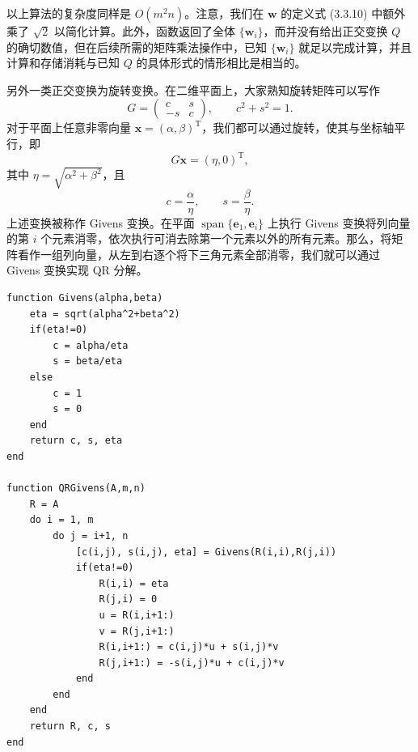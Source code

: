 以上算法的复杂度同样是 $O(m^2n)$。注意，我们在 $\bm w$ 的定义式 (3.3.10) 中额外乘了 $\sqrt2$ 以简化计算。此外，函数返回了全体 $\{\bm w_i\}$，而并没有给出正交变换 $Q$ 的确切数值，但在后续所需的矩阵乘法操作中，已知 $\{\bm w_i\}$ 就足以完成计算，并且计算和存储消耗与已知 $Q$ 的具体形式的情形相比是相当的。

另外一类正交变换为旋转变换。在二维平面上，大家熟知旋转矩阵可以写作
\begin{equation}
G=\begin{pmatrix}c&s\\-s&c\end{pmatrix},
\qquad c^2+s^2=1.
\tag{3.3.12}
\end{equation}
对于平面上任意非零向量 $\bm x=(\alpha,\beta)^{\mathrm T}$，我们都可以通过旋转，使其与坐标轴平行，即
\begin{equation}
G\bm x=(\eta,0)^{\mathrm T},
\tag{3.3.13}
\end{equation}
其中 $\eta=\sqrt{\alpha^2+\beta^2}$，且
\begin{equation}
c=\frac{\alpha}{\eta},\qquad s=\frac{\beta}{\eta}.
\tag{3.3.14}
\end{equation}
上述变换被称作 Givens 变换。在平面 $\operatorname{span}\{\bm e_1,\bm e_i\}$ 上执行 Givens 变换将列向量的第 $i$ 个元素消零，依次执行可消去除第一个元素以外的所有元素。那么，将矩阵看作一组列向量，从左到右逐个将下三角元素全部消零，我们就可以通过 Givens 变换实现 QR 分解。

\begin{algorithmBox}
\begin{lstlisting}[style=bellacode]
function Givens(alpha,beta)
    eta = sqrt(alpha^2+beta^2)
    if(eta!=0)
        c = alpha/eta
        s = beta/eta
    else
        c = 1
        s = 0
    end
    return c, s, eta
end

function QRGivens(A,m,n)
    R = A
    do i = 1, m
        do j = i+1, n
            [c(i,j), s(i,j), eta] = Givens(R(i,i),R(j,i))
            if(eta!=0)
                R(i,i) = eta
                R(j,i) = 0
                u = R(i,i+1:)
                v = R(j,i+1:)
                R(i,i+1:) = c(i,j)*u + s(i,j)*v
                R(j,i+1:) = -s(i,j)*u + c(i,j)*v
            end
        end
    end
    return R, c, s
end
\end{lstlisting}
\end{algorithmBox}

